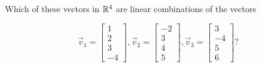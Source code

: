 \documentclass{ximera}
\begin{document}
\begin{example}
    Which of these vectors in $\mathbb{R}^4$ are linear combinations of the vectors

    \[
        \vec{v}_1 = \begin{bmatrix} 1 \\ 2 \\ 3 \\ -4 \end{bmatrix}, \vec{v}_2 = \begin{bmatrix} -2 \\ 3 \\ 4 \\ 5 \end{bmatrix}, \vec{v}_3 = \begin{bmatrix} 3 \\ -4 \\ 5 \\ 6 \end{bmatrix}?
    \]

    \begin{selectAll}
    \end{selectAll}
\end{example}
\end{document}
